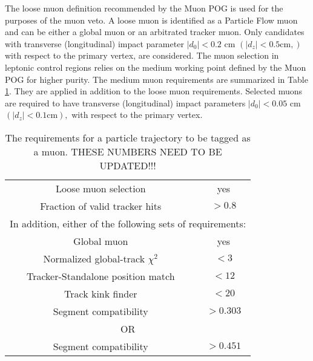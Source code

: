  The loose muon definition recommended by the Muon POG is used for the purposes of the muon veto. A loose muon is identified as a Particle Flow\cite{noauthor_cms_nodate} muon and can be either a global muon or an arbitrated tracker muon. Only candidates with transverse (longitudinal) impact parameter $|d_0|<0.2$ cm $(|d_z|<0.5 \text{cm},)$ with respect to the primary vertex, are considered. The muon selection in leptonic control regions relies on the medium working point defined by the Muon POG for higher purity. The medium muon requirements are summarized in Table \ref{MuonID}. They are applied in addition to the loose muon requirements. Selected muons are required to have transverse (longitudinal) impact parameters $|d_0|<0.05$ cm $(|d_z|<0.1 \text{cm}),$ with respect to the primary vertex. 

\begin{table}
 \centering
 \begin{tabular}{|*{2}{c|}}
 \hline
Loose muon selection & yes \\ 
Fraction of valid tracker hits & $> 0.8$ \\
\hline
\multicolumn{2}{|c|}{In addition, either of the following sets of requirements:} \\
\hline
Global muon & yes \\
Normalized global-track $\chi^2$ & $< 3$ \\
Tracker-Standalone position match & $< 12$ \\
Track kink finder & $< 20$ \\
Segment compatibility & $>0.303$ \\
\hline
\multicolumn{2}{|c|}{OR} \\
\hline
Segment compatibility & $> 0.451$ \\
\hline
 \end{tabular}
 \caption[Muon Identification Parameters]{The requirements for a particle trajectory to be tagged as a muon. THESE NUMBERS NEED TO BE UPDATED!!!}
 \label{MuonID}
 \end{table}
 
